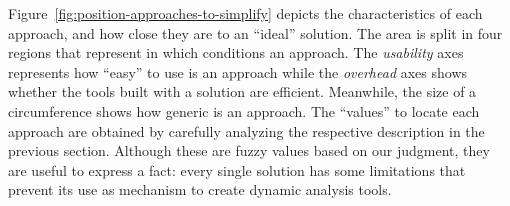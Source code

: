 Figure~\ref{fig:position-approaches-to-simplify} depicts the characteristics of each approach, and how close they are to an ``ideal'' solution.
The area is split in four regions that represent in which conditions an approach.
The \textit{usability} axes represents how ``easy'' to use is an approach while the \textit{overhead} axes shows whether the tools built with a solution are efficient. 
Meanwhile, the size of a circumference shows how generic is an approach.
The ``values'' to locate each approach are obtained by carefully analyzing the respective description in the previous section.
Although these are fuzzy values based on our judgment, they are useful to express a fact: every single solution has some limitations that prevent its use as mechanism to create dynamic analysis tools. 

\newcommand{\asymcloud}[2][.1]{%
\begin{scope}[#2]
\pgftransformscale{#1}%
\pgfpathmoveto{\pgfpoint{261 pt}{115 pt}} 
  \pgfpathcurveto{\pgfqpoint{70 pt}{107 pt}}
                 {\pgfqpoint{137 pt}{291 pt}}
                 {\pgfqpoint{260 pt}{273 pt}} 
  \pgfpathcurveto{\pgfqpoint{78 pt}{382 pt}}
                 {\pgfqpoint{381 pt}{445 pt}}
                 {\pgfqpoint{412 pt}{410 pt}}
  \pgfpathcurveto{\pgfqpoint{577 pt}{587 pt}}
                 {\pgfqpoint{698 pt}{488 pt}}
                 {\pgfqpoint{685 pt}{366 pt}}
  \pgfpathcurveto{\pgfqpoint{840 pt}{192 pt}}
                 {\pgfqpoint{610 pt}{157 pt}}
                 {\pgfqpoint{610 pt}{157 pt}}
  \pgfpathcurveto{\pgfqpoint{531 pt}{39 pt}}
                 {\pgfqpoint{298 pt}{51 pt}}
                 {\pgfqpoint{261 pt}{115 pt}}
\pgfusepath{fill,stroke}         
\end{scope}}  

